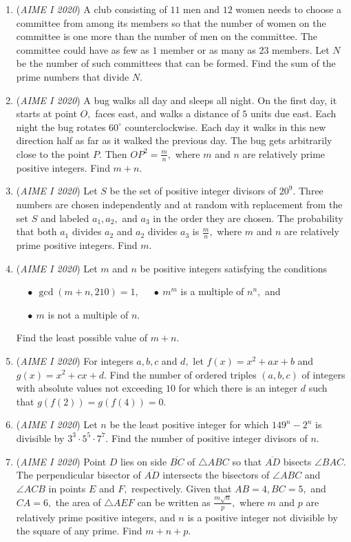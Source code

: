 \begin{enumerate}
 

	\item (\textit{AIME I 2020}) A club consisting of $11$ men and $12$ women needs to choose a committee from among its members so that the number of women on the committee is one more than the number of men on the committee. The committee could have as few as $1$ member or as many as $23$ members. Let $N$ be the number of such committees that can be formed. Find the sum of the prime numbers that divide $N.$


	\item (\textit{AIME I 2020}) A bug walks all day and sleeps all night. On the first day, it starts at point $O,$ faces east, and walks a distance of $5$ units due east. Each night the bug rotates $60^\circ$ counterclockwise. Each day it walks in this new direction half as far as it walked the previous day. The bug gets arbitrarily close to the point $P.$ Then $OP^2=\frac{m}{n},$ where $m$ and $n$ are relatively prime positive integers. Find $m+n.$


	\item (\textit{AIME I 2020}) Let $S$ be the set of positive integer divisors of $20^9.$ Three numbers are chosen independently and at random with replacement from the set $S$ and labeled $a_1,a_2,$ and $a_3$ in the order they are chosen. The probability that both $a_1$ divides $a_2$ and $a_2$ divides $a_3$ is $\frac{m}{n},$ where $m$ and $n$ are relatively prime positive integers. Find $m.$


	\item (\textit{AIME I 2020}) Let $m$ and $n$ be positive integers satisfying the conditions


 $\quad\bullet\ \gcd(m+n,210)=1,$
$\quad\bullet\ m^m$ is a multiple of $n^n,$ and


 $\quad\bullet\ m$ is not a multiple of $n.$


 Find the least possible value of $m+n.$


	\item (\textit{AIME I 2020}) For integers $a,b,c$ and $d,$ let $f(x)=x^2+ax+b$ and $g(x)=x^2+cx+d.$ Find the number of ordered triples $(a,b,c)$ of integers with absolute values not exceeding $10$ for which there is an integer $d$ such that $g(f(2))=g(f(4))=0.$


	\item (\textit{AIME I 2020}) Let $n$ be the least positive integer for which $149^n-2^n$ is divisible by $3^3\cdot5^5\cdot7^7.$ Find the number of positive integer divisors of $n.$


	\item (\textit{AIME I 2020}) Point $D$ lies on side $\overline{BC}$ of $\triangle ABC$ so that $\overline{AD}$ bisects $\angle BAC.$ The perpendicular bisector of $\overline{AD}$ intersects the bisectors of $\angle ABC$ and $\angle ACB$ in points $E$ and $F,$ respectively. Given that $AB=4,BC=5,$ and $CA=6,$ the area of $\triangle AEF$ can be written as $\frac{m\sqrt{n}}p,$ where $m$ and $p$ are relatively prime positive integers, and $n$ is a positive integer not divisible by the square of any prime. Find $m+n+p$.



\end{enumerate}
